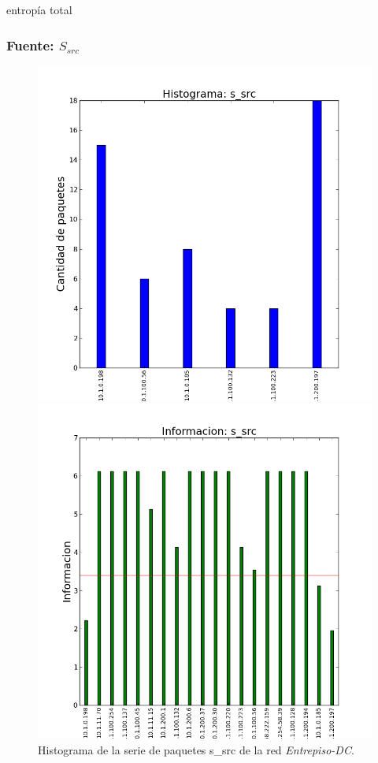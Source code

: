\documentclass[10pt, a4paper]{article}
\begin{document}
entropía total

\subsubsection{Fuente: $S_{src}$}

\begin{figure}[H]
  \begin{minipage}{0.48\linewidth}
    \includegraphics[width=\linewidth]{../imgs/entrepiso-dc-ips_s_src_hist.png}
    \caption{Histograma de la serie de paquetes s\_src de la red \emph{Entrepiso-DC}.}
    \label{fig:histograma-entrepiso-dc-s-src}
  \end{minipage}
\hfill
  \begin{minipage}{0.48\linewidth}
    \includegraphics[width=\linewidth]{../imgs/entrepiso-dc-ips_s_src_info.png}

\end{minipage}
\end{figure}
\end{document}
